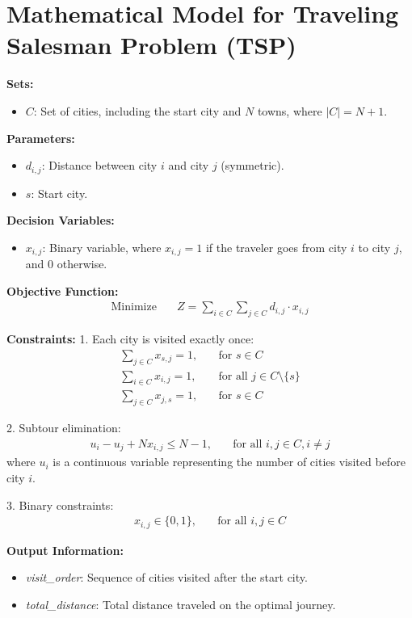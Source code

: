 \documentclass{article}
\begin{document}
\section*{Mathematical Model for Traveling Salesman Problem (TSP)}

\textbf{Sets:}
\begin{itemize}
    \item $C$: Set of cities, including the start city and $N$ towns, where $|C| = N + 1$.
\end{itemize}

\textbf{Parameters:}
\begin{itemize}
    \item $d_{i,j}$: Distance between city $i$ and city $j$ (symmetric).
    \item $s$: Start city.
\end{itemize}

\textbf{Decision Variables:}
\begin{itemize}
    \item $x_{i,j}$: Binary variable, where $x_{i,j} = 1$ if the traveler goes from city $i$ to city $j$, and $0$ otherwise.
\end{itemize}

\textbf{Objective Function:}
\begin{align*}
    \text{Minimize} \quad & Z = \sum_{i \in C} \sum_{j \in C} d_{i,j} \cdot x_{i,j}
\end{align*}

\textbf{Constraints:}
1. Each city is visited exactly once:
   \begin{align*}
       \sum_{j \in C} x_{s,j} = 1, \quad & \text{for } s \in C \\
       \sum_{i \in C} x_{i,j} = 1, \quad & \text{for all } j \in C \setminus \{s\} \\
       \sum_{j \in C} x_{j,s} = 1, \quad & \text{for } s \in C
   \end{align*}

2. Subtour elimination:
   \begin{align*}
       u_i - u_j + N x_{i,j} \leq N - 1, \quad & \text{for all } i,j \in C, i \neq j
   \end{align*}
   where $u_i$ is a continuous variable representing the number of cities visited before city $i$.

3. Binary constraints:
   \begin{align*}
       x_{i,j} \in \{0, 1\}, \quad & \text{for all } i,j \in C
   \end{align*}

\textbf{Output Information:}
\begin{itemize}
    \item \textit{visit\_order}: Sequence of cities visited after the start city.
    \item \textit{total\_distance}: Total distance traveled on the optimal journey.
\end{itemize}
\end{document}
